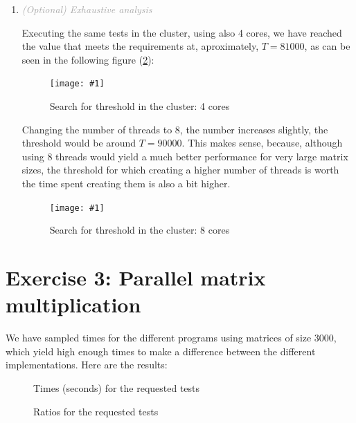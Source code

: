 \documentclass{article}
\newcommand{\myFigure}[4]{%
    \begin{figure}[!ht]
        \texttt{[image: \#1]}
        \centering
        \caption{#2}
        \label{#3}
    \end{figure}
}
\newcommand{\greyItem}[1]{\item\emph{\textcolor{darkgray}{#1}}}
\begin{document}
\begin{enumerate}[label=2.\arabic*,leftmargin=*]
\myFigure{../material/outputs/out2_final/threshold0.png}{Search for threshold in the lab computers}{threshold}{.7}

\pagebreak

\greyItem{(Optional) Exhaustive analysis}

Executing the same tests in the cluster, using also 4 cores, we have reached the value that meets the requirements at, aproximately, $T=81000$, as can be seen in the following figure (\ref{threshold_cluster4}):

\myFigure{../material/outputs/out2_final/threshold_4proc.png}{Search for threshold in the cluster: 4 cores}{threshold_cluster4}{.66}

Changing the number of threads to 8, the number increases slightly, the threshold would be around $T=90000$. This makes sense, because, although using 8 threads would yield a much better performance for very large matrix sizes, the threshold for which creating a higher number of threads is worth the time spent creating them is also a bit higher.

\myFigure{../material/outputs/out2_final/threshold_8proc.png}{Search for threshold in the cluster: 8 cores}{threshold_cluster8}{.66}

\end{enumerate}


\pagebreak

\section{Exercise 3: Parallel matrix multiplication}

We have sampled times for the different programs using matrices of size 3000, which yield high enough times to make a difference between the different implementations. Here are the results:

\begin{figure}[h]
    
    \centering
    \caption{Times (seconds) for the requested tests}
\end{figure}

\begin{figure}[h]
    
    \centering
    \caption{Ratios for the requested tests}
\end{figure}
\end{document}
